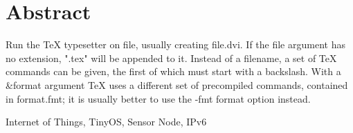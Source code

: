 %
%

%
%
\renewcommand{\baselinestretch}{1.5}
\fontsize{12pt}{13pt}\selectfont

\chapter[\textbf{ABSTRACT}]{\textrm{\textbf{Abstract}}}
\vspace{2em}
\noindent
Run  the  TeX  typesetter on file, usually creating file.dvi.
If the file argument has no extension, ".tex" will be appended to it.
Instead of a filename, a set of TeX commands can be given, the first of which must start with a backslash.
With a \&format argument TeX uses a different set of  precompiled  commands,
contained in format.fmt; it is usually better to use the -fmt format option instead.

\vspace{1em}
 \quad Internet of Things, TinyOS, Sensor Node, IPv6

